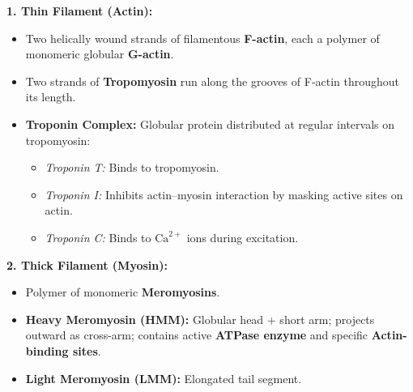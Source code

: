 \documentclass[11pt,a4paper]{article}
\begin{document}
\begin{formulabox}
\textbf{1. Thin Filament (Actin):}
\begin{itemize}[leftmargin=1.2em, itemsep=2pt]
  \item Two helically wound strands of filamentous \textbf{F-actin}, each a polymer of monomeric globular \textbf{G-actin}.
  \item Two strands of \textbf{Tropomyosin} run along the grooves of F-actin throughout its length.
  \item \textbf{Troponin Complex:} Globular protein distributed at regular intervals on tropomyosin:
  \begin{itemize}[label=$\circ$]
    \item \textit{Troponin T:} Binds to tropomyosin.
    \item \textit{Troponin I:} Inhibits actin--myosin interaction by masking active sites on actin.
    \item \textit{Troponin C:} Binds to $\text{Ca}^{2+}$ ions during excitation.
  \end{itemize}
\end{itemize}

\textbf{2. Thick Filament (Myosin):}
\begin{itemize}[leftmargin=1.2em, itemsep=2pt]
  \item Polymer of monomeric \textbf{Meromyosins}.
  \item \textbf{Heavy Meromyosin (HMM):} Globular head + short arm; projects outward as cross-arm; contains active \textbf{ATPase enzyme} and specific \textbf{Actin-binding sites}.
  \item \textbf{Light Meromyosin (LMM):} Elongated tail segment.
\end{itemize}
\end{formulabox}
\end{document}
